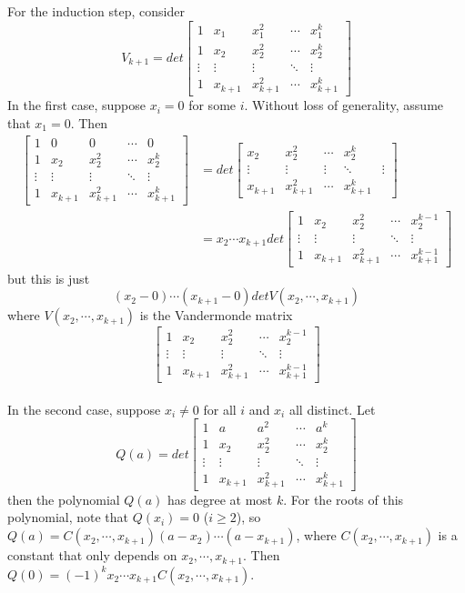 \documentclass[12pt]{article}
\begin{document}
For the induction step, consider 
$$V_{k+1} = det \begin{bmatrix} 1 & x_1 & x_1^2 & \cdots & x_1^{k} \\ 1 &x_2 & x_2^2 & \cdots & x_2^{k} \\ \vdots & \vdots & \vdots & \ddots & \vdots \\ 1 &x_{k+1} & x_{k+1}^2 & \cdots & x_{k+1}^{k} \end{bmatrix}$$
In the first case, suppose $x_i = 0$ for some $i$. Without loss of generality, assume that $x_1 = 0$. Then 
\begin{align*} 
\begin{bmatrix} 1 & 0 & 0 & \cdots & 0 \\ 1 &x_2 & x_2^2 & \cdots & x_2^{k} \\ \vdots & \vdots & \vdots & \ddots & \vdots \\ 1 &x_{k+1} & x_{k+1}^2 & \cdots & x_{k+1}^{k} \end{bmatrix} &= det \begin{bmatrix} x_2 & x_2^2 & \cdots & x_2^{k} \\ \vdots & \vdots & \vdots & \ddots & \vdots \\ x_{k+1} & x_{k+1}^2 & \cdots & x_{k+1}^{k} \end{bmatrix}\\
&= x_2 \cdots x_{k+1} det \begin{bmatrix} 1 &x_2 & x_2^2 & \cdots & x_2^{k-1} \\ \vdots & \vdots & \vdots & \ddots & \vdots \\ 1 & x_{k+1} & x_{k+1}^2 & \cdots & x_{k+1}^{k-1} \end{bmatrix}
\end{align*}
but this is just
$$(x_2 - 0) \cdots (x_{k+1} - 0) det V(x_2, \cdots, x_{k+1}) $$
where $V(x_2, \cdots, x_{k+1})$ is the Vandermonde matrix 
$$\begin{bmatrix} 1 &x_2 & x_2^2 & \cdots & x_2^{k-1} \\ \vdots & \vdots & \vdots & \ddots & \vdots \\ 1 & x_{k+1} & x_{k+1}^2 & \cdots & x_{k+1}^{k-1} \end{bmatrix}$$\\

In the second case, suppose $x_i \neq 0$ for all $i$ and $x_i$ all distinct. Let
$$Q(a) = det \begin{bmatrix} 1 & a & a^2 & \cdots & a^{k} \\ 1 &x_2 & x_2^2 & \cdots & x_2^{k} \\ \vdots & \vdots & \vdots & \ddots & \vdots \\ 1 &x_{k+1} & x_{k+1}^2 & \cdots & x_{k+1}^{k} \end{bmatrix}$$
then the polynomial $Q(a)$ has degree at most $k$. For the roots of this polynomial, note that $Q(x_i) = 0$ ($i \geq 2$), so $Q(a) = C(x_2, \cdots, x_{k+1}) (a - x_2) \cdots (a - x_{k+1})$, where $C(x_2, \cdots, x_{k+1})$ is a constant that only depends on $x_2, \cdots, x_{k+1}$. Then $Q(0) = (-1)^k x_2 \cdots x_{k+1} C(x_2, \cdots, x_{k+1})$.\\
\end{document}
